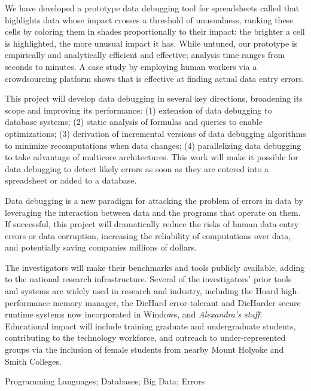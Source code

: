 We have developed a prototype data debugging tool for spreadsheets called
\checkcell{} that
 highlights data whose impact crosses a threshold of unusualness,
ranking these cells by coloring them in shades proportionally to their
impact: the brighter a cell is highlighted, the more unusual impact it
has.  While untuned, our prototype is empirically and analytically
efficient and effective; analysis time ranges from seconds to minutes.
A case study by employing human workers via a crowdsourcing platform
shows that \checkcell{} is effective at
finding actual data entry errors.

This project will develop data debugging in several key directions,
broadening its scope and improving its performance: (1) extension of
data debugging to database systems; (2) static analysis of formulas
and queries to enable optimizations; (3) derivation of incremental
versions of data debugging algorithms to minimize recomputations when
data changes; (4) parallelizing data debugging to take advantage of
multicore architectures. This work will make it possible for data
debugging to detect likely errors as soon as they are entered into a
spreadsheet or added to a database.

\smallskip
{}
Data debugging is a new paradigm for attacking the problem of errors
in data by leveraging the interaction between data and the programs
that operate on them.  If successful, this project will dramatically
reduce the risks of human data entry errors or data corruption,
increasing the reliability of computations over data, and potentially
saving companies millions of dollars.

The investigators will make their benchmarks and tools publicly
available, adding to the national research infrastructure. Several of
the investigators' prior tools and systems are widely used in research
and industry, including the Hoard high-performance memory manager, the
DieHard error-tolerant and DieHarder secure runtime systems now
incorporated in Windows, and \emph{Alexandra's stuff}. Educational
impact will include training graduate and undergraduate students,
contributing to the technology workforce, and outreach to
under-represented groups via the inclusion of female students from
nearby Mount Holyoke and Smith Colleges.

\smallskip
{} Programming Languages; Databases; Big Data; Errors
